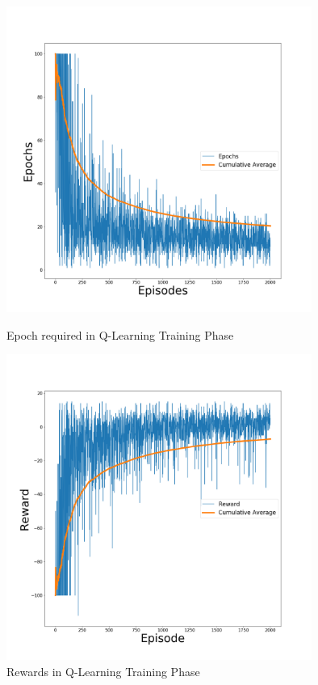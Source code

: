 \begin{figure}[!h]
	\centering
	\vspace{-2cm}
	\includegraphics[width=\linewidth,height=10cm]{./figs/q_epoch_15.png}
	\vspace{-1cm}
	\caption{Epoch required in Q-Learning Training Phase}
	\vspace{0cm}
	\includegraphics[width=\linewidth,height=10cm]{./figs/q_reward_15.png}
	\vspace{-1cm}
	\caption{Rewards in Q-Learning Training Phase}
\end{figure}
